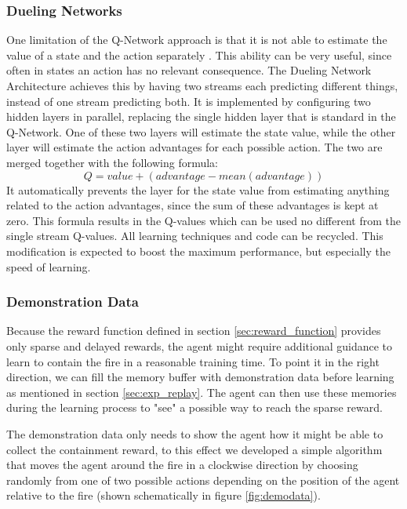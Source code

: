 \subsubsection{Dueling Networks}\label{sec:dueling}
One limitation of the Q-Network approach is that it is not able to estimate the value of a state and the action separately \citep{wang2015dueling}. This ability can be very useful, since often in states an action has no relevant consequence. The Dueling Network Architecture achieves this by having two streams each predicting different things, instead of one stream predicting both. It is implemented by configuring two hidden layers in parallel, replacing the single hidden layer that is standard in the Q-Network. One of these two layers will estimate the state value, while the other layer will estimate the action advantages for each possible action. The two are merged together with the following formula:
$$ Q = value + (advantage - mean(advantage))$$
It automatically prevents the layer for the state value from estimating anything related to the action advantages, since the sum of these advantages is kept at zero. This formula results in the Q-values which can be used no different from the single stream Q-values. All learning techniques and code can be recycled. This modification is expected to boost the maximum performance, but especially the speed of learning.



\subsubsection{Demonstration Data}\label{sec:demo_data}
Because the reward function defined in section \ref{sec:reward_function} provides only sparse and delayed rewards, the agent might require additional guidance to learn to contain the fire in a reasonable training time. To point it in the right direction, we can fill the memory buffer with demonstration data before learning as mentioned in section \ref{sec:exp_replay}. The agent can then use these memories during the learning process to "see" a possible way to reach the sparse reward.

The demonstration data only needs to show the agent how it might be able to collect the containment reward, to this effect we developed a simple algorithm that moves the agent around the fire in a clockwise direction by choosing randomly from one of two possible actions depending on the position of the agent relative to the fire (shown schematically in figure \ref{fig:demodata}). 

